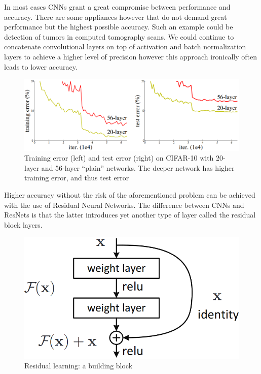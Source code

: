 \documentclass{ijisa}
\begin{document}
In most cases CNNs grant a great compromise between performance and accuracy. There are some appliances however that do not demand great performance but the highest possible accuracy. Such an example could be detection of tumors in computed tomography scans. We could continue to concatenate convolutional layers on top of activation and batch normalization layers to achieve a higher level of precision however this approach ironically often leads to lower accuracy\cite{he2016deep}.

\begin{figure}[!h]
\centering
\includegraphics[width=.8\columnwidth]{Images/deep_cnn_result_error.png}
\caption{Training error (left) and test error (right) on CIFAR-10 with 20-layer and 56-layer “plain” networks. The deeper network has higher training error, and thus test error} \label{fig:fig4}
\end{figure}

Higher accuracy without the risk of the aforementioned problem can be achieved with the use of Residual Neural Networks. The difference between CNNs and ResNets is that the latter introduces yet another type of layer called the residual block layers.


\begin{figure}[!h]
\centering
\includegraphics[width=.8\columnwidth]{Images/residual_block.png}
\caption{Residual learning: a building block} \label{fig:fig5}
\end{figure}
\end{document}
